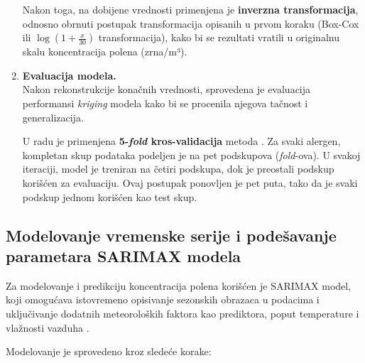 \documentclass[12pt]{article}
\begin{document}
\begin{enumerate}
    Nakon toga, na dobijene vrednosti primenjena je \textbf{inverzna transformacija}, odnosno obrnuti postupak transformacija opisanih u prvom koraku (Box-Cox ili $\log(1 + \frac{x}{30})$ transformacija), kako bi se rezultati vratili u originalnu skalu koncentracija polena (zrna/m³).

    \item \textbf{Evaluacija modela.} \\

    Nakon rekonstrukcije konačnih vrednosti, sprovedena je evaluacija performansi \textit{kriging} modela kako bi se procenila njegova tačnost i generalizacija. 

    U radu je primenjena \textbf{5-\textit{fold} kros-validacija} metoda \cite{hyndman2018forecasting}. Za svaki alergen, kompletan skup podataka podeljen je na pet podskupova (\textit{fold}-ova). U svakoj iteraciji, model je treniran na četiri podskupa, dok je preostali podskup korišćen za evaluaciju. Ovaj postupak ponovljen je pet puta, tako da je svaki podskup jednom korišćen kao test skup. 

\end{enumerate}

\subsection{Modelovanje vremenske serije i podešavanje parametara SARIMAX modela}

Za modelovanje i predikciju koncentracija polena korišćen je SARIMAX model, koji omogućava istovremeno opisivanje sezonskih obrazaca u podacima i uključivanje dodatnih meteoroloških faktora kao prediktora, poput temperature i vlažnosti vazduha \cite{box1970, brockwell2002, hyndman2018forecasting}.

Modelovanje je sprovedeno kroz sledeće korake:
\end{document}

